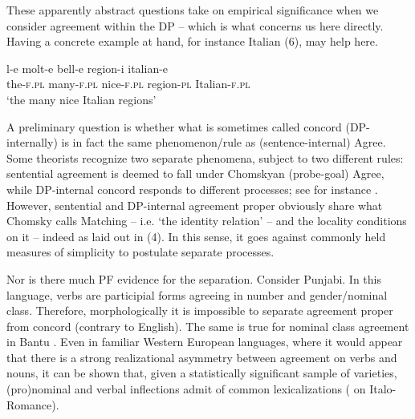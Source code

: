 \documentclass[output=paper]{langsci/langscibook}
\begin{document}
These apparently abstract questions take on empirical significance when we consider agreement within the DP – which is what concerns us here directly. Having a concrete example at hand, for instance Italian (6), may help here. 

\ea%
    \label{ex:manzini:6}
    \gll l-e    molt-e   bell-e    region-i  italian-e\\
         the-\textsc{f.pl}   many-\textsc{f.pl}   nice-\textsc{f.pl}   region-\textsc{pl}    Italian-\textsc{f.pl} \\
    \glt ‘the many nice Italian regions’
\z

A preliminary question is whether what is sometimes called concord (DP-internally) is in fact the same phenomenon\slash rule as (sentence-internal) Agree. Some theorists recognize two separate phenomena, subject to two different rules: sentential agreement is deemed to fall under Chomskyan (probe-goal) Agree, while DP-internal concord responds to different processes; see for instance \citet{Giusti2008}. However, sentential and DP-internal agreement proper obviously share what Chomsky calls Matching – i.e. ‘the identity relation’ – and the locality conditions on it – indeed as laid out in (4). In this sense, it goes against commonly held measures of simplicity to postulate separate processes. 

Nor is there much PF evidence for the separation. Consider Punjabi. In this language, verbs are participial forms agreeing in number and gender\slash nominal class. Therefore, morphologically it is impossible to separate agreement proper from concord (contrary to English). The same is true for nominal class agreement in Bantu \citep{Baker2008}. Even in familiar Western European languages, where it would appear that there is a strong realizational asymmetry between agreement on verbs and nouns, it can be shown that, given a statistically significant sample of varieties, (pro)nominal and verbal inflections admit of common lexicalizations (\citealt{Manzini2007} on Italo-Romance).
\end{document}
